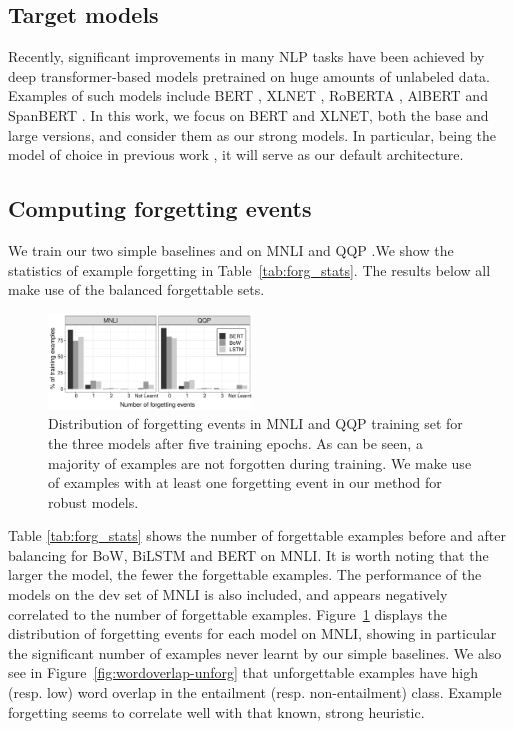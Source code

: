 \subsection{Target models}
\label{sec:strong}
Recently, significant improvements in many NLP tasks have been achieved by deep transformer-based models pretrained on huge amounts of unlabeled data.
Examples of such models include BERT \cite{devlin2018bert}, XLNET \cite{yang2019xlnet}, RoBERTA \cite{roberta2019}, AlBERT \cite{lan2019albert} and SpanBERT \cite{spanBERT2019}.
In this work, we focus on BERT and XLNET, both the base and large versions, and consider them as our strong models. In particular, \bertbase being the model of choice in previous work \cite{clark2019dont,zhang-etal-2019-paws}, it will serve as our default architecture.

\subsection{Computing forgetting events}
\label{sec:forg_stat}

We train our two simple baselines and \bertbase on MNLI and QQP
.We show the statistics of example forgetting in Table~\ref{tab:forg_stats}. The results below all make use of the balanced forgettable sets.

\begin{figure}[t]
\centering
  \includegraphics[width=0.48\textwidth]{figures/forgetting_counts.pdf}
  \caption{Distribution of forgetting events in MNLI and QQP training set for the three models after five training epochs. As can be seen, a majority of examples are not forgotten during training. We make use of examples 
  with at least one forgetting event in our method for robust models.}
\label{fig:forgcount-freq}
\end{figure}

Table \ref{tab:forg_stats} shows the number of forgettable examples before and after balancing for BoW, BiLSTM and BERT on MNLI. It is worth noting that the larger the model, the fewer the forgettable examples. The performance of the models on the dev set of MNLI is also included, and appears negatively correlated to the number of forgettable examples. Figure~\ref{fig:forgcount-freq} displays the distribution of forgetting events for each model on MNLI, showing in particular the significant number of examples never learnt by our simple baselines. We also see in Figure~\ref{fig:wordoverlap-unforg} that unforgettable examples have high (resp. low) word overlap in the entailment (resp. non-entailment) class. Example forgetting seems to correlate well with that known, strong heuristic.

